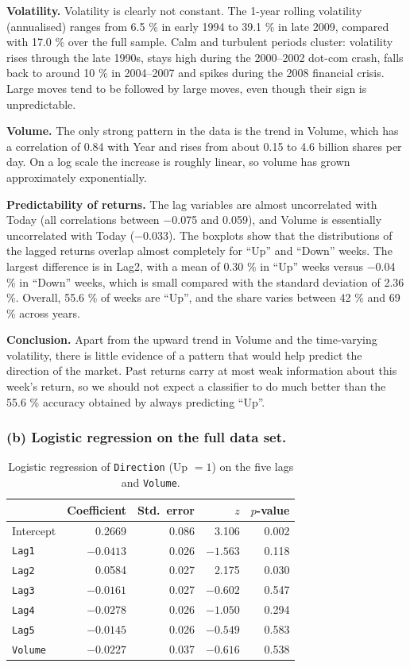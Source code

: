 \documentclass[11pt]{article}
\begin{document}
\textbf{Volatility.} Volatility is clearly not constant. The 1-year rolling volatility (annualised) ranges from 6.5 \% in early 1994 to 39.1 \% in late 2009, compared with 17.0 \% over the full sample. Calm and turbulent periods cluster: volatility rises through the late 1990s, stays high during the 2000--2002 dot-com crash, falls back to around 10 \% in 2004--2007 and spikes during the 2008 financial crisis. Large moves tend to be followed by large moves, even though their sign is unpredictable.

\textbf{Volume.} The only strong pattern in the data is the trend in Volume, which has a correlation of 0.84 with Year and rises from about 0.15 to 4.6 billion shares per day. On a log scale the increase is roughly linear, so volume has grown approximately exponentially.

\textbf{Predictability of returns.} The lag variables are almost uncorrelated with Today (all correlations between $-$0.075 and 0.059), and Volume is essentially uncorrelated with Today ($-$0.033). The boxplots show that the distributions of the lagged returns overlap almost completely for ``Up'' and ``Down'' weeks. The largest difference is in Lag2, with a mean of 0.30 \% in ``Up'' weeks versus $-$0.04 \% in ``Down'' weeks, which is small compared with the standard deviation of 2.36 \%. Overall, 55.6 \% of weeks are ``Up'', and the share varies between 42 \% and 69 \% across years.

\textbf{Conclusion.} Apart from the upward trend in Volume and the time-varying volatility, there is little evidence of a pattern that would help predict the direction of the market. Past returns carry at most weak information about this week's return, so we should not expect a classifier to do much better than the 55.6 \% accuracy obtained by always predicting ``Up''.

\subsubsection*{(b) Logistic regression on the full data set.}

\begin{table}[H]
  \centering
  \begin{tabular}{lrrrr}
    \toprule
    & Coefficient & Std.\ error & $z$ & $p$-value \\
    \midrule
    Intercept & 0.2669 & 0.086 & 3.106 & 0.002 \\
    \texttt{Lag1} & $-0.0413$ & 0.026 & $-1.563$ & 0.118 \\
    \texttt{Lag2} & 0.0584 & 0.027 & 2.175 & 0.030 \\
    \texttt{Lag3} & $-0.0161$ & 0.027 & $-0.602$ & 0.547 \\
    \texttt{Lag4} & $-0.0278$ & 0.026 & $-1.050$ & 0.294 \\
    \texttt{Lag5} & $-0.0145$ & 0.026 & $-0.549$ & 0.583 \\
    \texttt{Volume} & $-0.0227$ & 0.037 & $-0.616$ & 0.538 \\
    \bottomrule
  \end{tabular}
  \caption{Logistic regression of \texttt{Direction} (Up $=1$) on the five lags and \texttt{Volume}.}
\end{table}
\end{document}
